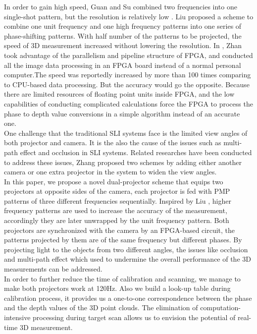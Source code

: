\documentclass[10pt,letterpaper]{article}
\begin{document}
In order to gain high speed, Guan \cite{guan03}{\etal} and Su \cite{suwh06}{\etal} combined two frequencies into one single-shot pattern, but the resolution is relatively low \cite{zhan06}. Liu \cite{kai10}{\etal}proposed a scheme to combine one unit frequency and one high frequency patterns into one series of phase-shifting patterns. With half number of the patterns to be projected, the speed of 3D measurement increased without lowering the resolution. In \cite{zhan17}, Zhan {\etal} took advantage of the parallelism and pipeline structure of FPGA, and conducted all the image data processing in an FPGA board instead of a normal personal computer.The speed was reportedly increased by more than 100 times comparing to CPU-based data processing. But the accuracy would go the opposite. Because there are limited resources of floating point units inside FPGA,  and the low capabilities of conducting complicated calculations force the FPGA to process the phase to depth value conversions in a simple algorithm instead of an accurate one.\\
One challenge that the traditional SLI systems face is the limited view angles of both projector and camera. It is the also the cause of the issues such as multi-path effect \cite{otoo16} and occlusion \cite{lin13} in SLI systems. Related researches have been conducted to address these issues, Zhang {\etal} proposed two schemes by adding either another camera or one extra projector in the system to widen the view angles.
\\
In this paper, we propose a novel dual-projector scheme that equips two projectors at opposite sides of the camera, each projector is fed with PMP patterns of three different frequencies sequentially. Inspired by Liu {\etal}, higher frequency patterns are used to increase the accuracy of the measurement, accordingly they are later unwrapped by the unit frequency pattern. Both projectors are synchronized with the camera by an FPGA-based circuit, the patterns projected by them are of the same frequency but different phases. By projecting light to the objects from two different angles, the issues like occlusion and multi-path effect which used to undermine the overall performance of the 3D measurements can be addressed.\\
In order to further reduce the time of calibration and scanning, we manage to make both projectors work at 120Hz. Also we build a look-up table during calibration process, it provides us a one-to-one correspondence between the phase and the depth values of the 3D point clouds. The elimination of computation-intensive processing during target scan allows us to envision the potential of real-time 3D measurement.
\end{document}

